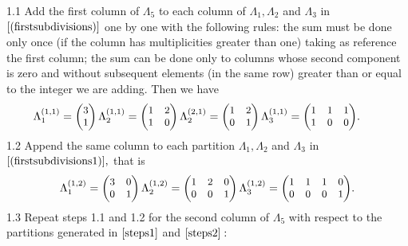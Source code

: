 \hskip-0.5cm 1.1 Add the first column of \(\Lambda_5\) to each column of \(\Lambda_1, \Lambda_2\) and \(\Lambda_3\) in \(\eqref{(firstsubdivisions)}\) one by one with the following rules: the sum must be done only once (if the column has multiplicities greater than one) taking as reference the first column; the sum can be done only to columns whose second component is zero and without subsequent elements (in the same row) greater than or equal to the integer we are adding. Then we have
\begin{equation}
\!\!\!\!\!\!\!\!\!\!\!{\small \Lambda^{(1,1)}_1= \begin{pmatrix}
3 \\
1
\end{pmatrix} \Lambda^{(1,1)}_2 = \begin{pmatrix}
1 & 2 \\
1 & 0
\end{pmatrix} \Lambda^{(2,1)}_2 = \begin{pmatrix}
1 & 2 \\
0 & 1
\end{pmatrix}  \Lambda^{(1,1)}_3=\begin{pmatrix}
1 & 1 & 1 \\
1 & 0 & 0
\end{pmatrix}}. 
\label{steps1}
\end{equation}
1.2 Append the same column to each partition
\(\Lambda_1, \Lambda_2\) and \(\Lambda_3\) in \(\eqref{(firstsubdivisions1)},\) that is\\
\begin{equation}
{\small \Lambda^{(1,2)}_1= \begin{pmatrix}
3 & 0 \\
0 & 1
\end{pmatrix}  \Lambda^{(1,2)}_2= \begin{pmatrix}
1 & 2 & 0\\
0 & 0 & 1
\end{pmatrix}  \Lambda^{(1,2)}_3=\begin{pmatrix}
1 & 1 & 1 & 0\\
0 & 0 & 0 & 1
\end{pmatrix}}.
\label{steps2}
\end{equation}
1.3 Repeat steps 1.1 and 1.2 for the second
column of \(\Lambda_5\) with respect to the partitions generated in \(\eqref{steps1}\) and \(\eqref{steps2}:\)\\
